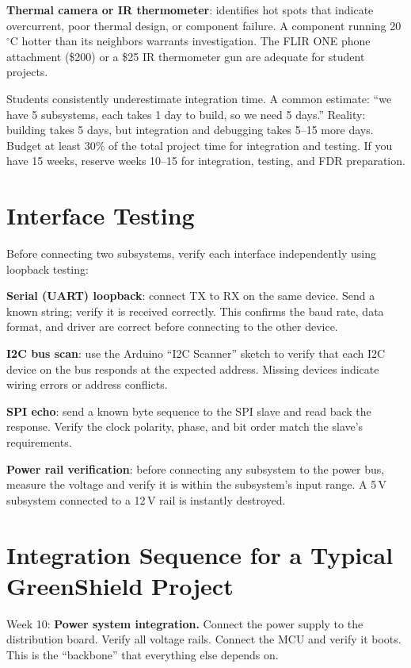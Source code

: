 \documentclass[11pt,letterpaper,twoside,openany]{book}
\newcommand{\degC}{\ensuremath{{}^{\circ}\text{C}}}
\begin{document}
\textbf{Thermal camera or IR thermometer}: identifies hot spots that indicate overcurrent, poor thermal design, or component failure. A component running 20\,\degC{} hotter than its neighbors warrants investigation. The FLIR ONE phone attachment (\$200) or a \$25 IR thermometer gun are adequate for student projects.

\begin{warningbox}
Students consistently underestimate integration time. A common estimate: ``we have 5 subsystems, each takes 1 day to build, so we need 5 days.'' Reality: building takes 5 days, but integration and debugging takes 5--15 more days. Budget at least 30\% of the total project time for integration and testing. If you have 15 weeks, reserve weeks 10--15 for integration, testing, and FDR preparation.
\end{warningbox}
\section{Interface Testing}
Before connecting two subsystems, verify each interface independently using loopback testing:

\textbf{Serial (UART) loopback}: connect TX to RX on the same device. Send a known string; verify it is received correctly. This confirms the baud rate, data format, and driver are correct before connecting to the other device.

\textbf{I2C bus scan}: use the Arduino ``I2C Scanner'' sketch to verify that each I2C device on the bus responds at the expected address. Missing devices indicate wiring errors or address conflicts.

\textbf{SPI echo}: send a known byte sequence to the SPI slave and read back the response. Verify the clock polarity, phase, and bit order match the slave's requirements.

\textbf{Power rail verification}: before connecting any subsystem to the power bus, measure the voltage and verify it is within the subsystem's input range. A 5\,V subsystem connected to a 12\,V rail is instantly destroyed.

\section{Integration Sequence for a Typical GreenShield Project}
Week 10: \textbf{Power system integration.} Connect the power supply to the distribution board. Verify all voltage rails. Connect the MCU and verify it boots. This is the ``backbone'' that everything else depends on.
\end{document}
